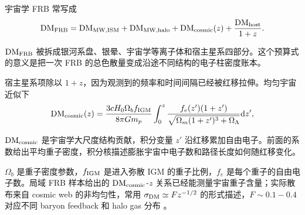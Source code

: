 宇宙学 FRB 常写成
\begin{equation}
  {\rm DM}_{\rm FRB}
  =
  {\rm DM}_{\rm MW,ISM}
  +{\rm DM}_{\rm MW,halo}
  +{\rm DM}_{\rm cosmic}(z)
  +\frac{{\rm DM}_{\rm host}}{{1+z}} .
  \label{eq:ch14-frb-dm-budget}
\end{equation}
\begin{formulaexplain}[公式 (14.7) 解读]
\({\rm DM}_{\rm FRB}\) 被拆成银河系盘、银晕、宇宙学等离子体和宿主星系四部分。这个预算式的意义是把一次 FRB 的总色散量变成沿途不同结构的电子柱密度账本。
\end{formulaexplain}
宿主星系项除以 \(1+z\)，因为观测到的频率和时间间隔已经被红移拉伸。均匀宇宙近似下
\begin{equation}
  {\rm DM}_{\rm cosmic}(z)
  =
  \frac{3cH_0\Omega_b f_{\rm IGM}}{8\pi Gm_p}
  \int_0^z
  \frac{f_e(z')(1+z')}{\sqrt{\Omega_m(1+z')^3+\Omega_\Lambda}}
  {\rm d}z' ,
  \label{eq:ch14-cosmic-dm}
\end{equation}
\begin{formulaexplain}[公式 (14.8) 解读]
\({\rm DM}_{\rm cosmic}\) 是宇宙学大尺度结构贡献，积分变量 \(z'\) 沿红移累加自由电子。前面的系数给出平均重子密度，积分核描述膨胀宇宙中电子数和路径长度如何随红移变化。
\end{formulaexplain}
\(\Omega_b\) 是重子密度参数，\(f_{\rm IGM}\) 是进入弥散 IGM 的重子比例，\(f_e\) 是每个重子的自由电子数。局域 FRB 样本给出的 \({\rm DM}_{\rm cosmic}\)-\(z\) 关系已经能测量宇宙重子含量；实际散布来自 cosmic web 的非均匀性，常用 \(\sigma_{\rm DM}\simeq F z^{-1/2}\) 的形式描述，\(F\sim0.1-0.4\) 对应不同 baryon feedback 和 halo gas 分布 \citep{2020Natur.581..391M,2014ApJ...790..101S}。

